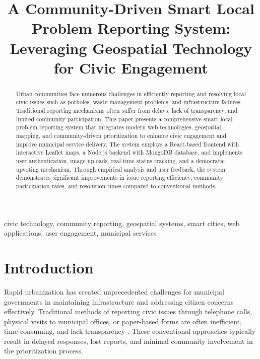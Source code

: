\documentclass[journal,10pt,twocolumn]{IEEEtran}
\begin{document}
\title{A Community-Driven Smart Local Problem Reporting System: Leveraging Geospatial Technology for Civic Engagement}

\author{
}

\maketitle

\begin{abstract}
Urban communities face numerous challenges in efficiently reporting and resolving local civic issues such as potholes, waste management problems, and infrastructure failures. Traditional reporting mechanisms often suffer from delays, lack of transparency, and limited community participation. This paper presents a comprehensive smart local problem reporting system that integrates modern web technologies, geospatial mapping, and community-driven prioritization to enhance civic engagement and improve municipal service delivery. The system employs a React-based frontend with interactive Leaflet maps, a Node.js backend with MongoDB database, and implements user authentication, image uploads, real-time status tracking, and a democratic upvoting mechanism. Through empirical analysis and user feedback, the system demonstrates significant improvements in issue reporting efficiency, community participation rates, and resolution times compared to conventional methods.
\end{abstract}

\begin{IEEEkeywords}
civic technology, community reporting, geospatial systems, smart cities, web applications, user engagement, municipal services
\end{IEEEkeywords}

\section{Introduction}
Rapid urbanization has created unprecedented challenges for municipal governments in maintaining infrastructure and addressing citizen concerns effectively. Traditional methods of reporting civic issues through telephone calls, physical visits to municipal offices, or paper-based forms are often inefficient, time-consuming, and lack transparency \cite{smith2020}. These conventional approaches typically result in delayed responses, lost reports, and minimal community involvement in the prioritization process.
\end{document}
